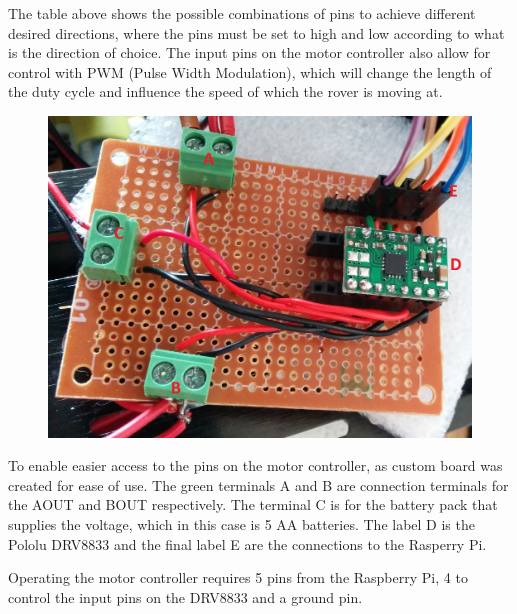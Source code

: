 The table above shows the possible combinations of pins to achieve different desired directions, where the pins must be set to high and low according to what is the direction of choice. The input pins on the motor controller also allow for control with PWM (Pulse Width Modulation), which will change the length of the duty cycle and influence the speed of which the rover is moving at\cite{DRV8833}. %

\begin{figure}[H]
	\centering
	\includegraphics[width=.5\linewidth]{images/labelled.jpg}
\end{figure}

To enable easier access to the pins on the motor controller, as custom board was created for ease of use. The green terminals A and B are connection terminals for the AOUT and BOUT respectively. The terminal C is for the battery pack that supplies the voltage, which in this case is 5 AA batteries. The label D is the Pololu DRV8833 and the final label E are the connections to the Rasperry Pi. 

Operating the motor controller requires 5 pins from the Raspberry Pi, 4 to control the input pins on the DRV8833 and a ground pin.